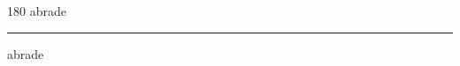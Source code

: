 
\begin{frame}
\begin{center}
\begin{turn}{180}
{\fontsize{2.5cm}{1em}\selectfont abrade}
\end{turn}
\vspace{1em}\par  
\hrule
\vspace{1em}\par  
{\fontsize{2.5cm}{1em}\selectfont abrade}
\end{center}
\end{frame}
